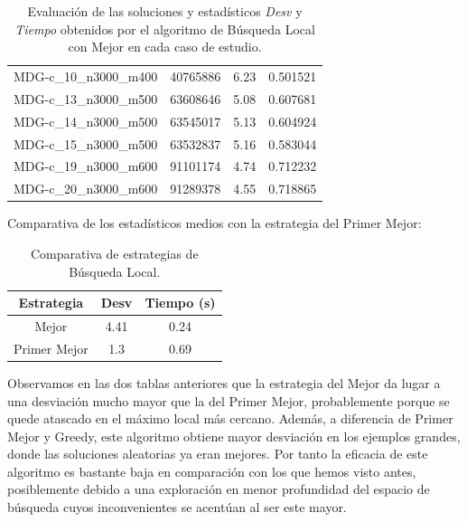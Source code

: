 \documentclass{article}
\begin{document}
\begin{table}[H]
\begin{tabular}{|cccc|}
		MDG-c\_10\_n3000\_m400 & 40765886 & 6.23 & 0.501521\\
		MDG-c\_13\_n3000\_m500 & 63608646 & 5.08 & 0.607681\\
		MDG-c\_14\_n3000\_m500 & 63545017 & 5.13 & 0.604924\\
		MDG-c\_15\_n3000\_m500 & 63532837 & 5.16 & 0.583044\\
		MDG-c\_19\_n3000\_m600 & 91101174 & 4.74 & 0.712232\\
		MDG-c\_20\_n3000\_m600 & 91289378 & 4.55 & 0.718865\\
		\hline
	\end{tabular}
	\caption{Evaluación de las soluciones y estadísticos \emph{Desv} y \emph{Tiempo} obtenidos por el algoritmo de Búsqueda Local
		con Mejor en cada caso de estudio.}
	\label{tab:bs-mejor}
\end{table}


Comparativa de los estadísticos medios con la estrategia del Primer Mejor:

\begin{table}[H]
	\centering
	\begin{tabular}{|ccc|}
		\hline
		Estrategia & Desv & Tiempo (s)\\ \hline
		Mejor & 4.41 & 0.24 \\
		Primer Mejor & 1.3 & 0.69 \\
		\hline
	\end{tabular}
	\caption{Comparativa de estrategias de Búsqueda Local.}
	\label{tab:comparativa-bs}
\end{table}

Observamos en las dos tablas anteriores que la estrategia del Mejor da lugar a una desviación mucho mayor que la del Primer Mejor,
probablemente porque se quede atascado en el máximo local más cercano. Además, a diferencia de Primer Mejor y Greedy, este algoritmo
obtiene mayor desviación en los ejemplos grandes, donde las soluciones aleatorias ya eran mejores. Por tanto la eficacia de este
algoritmo es bastante baja en comparación con los que hemos visto antes, posiblemente debido a una exploración en menor profundidad
del espacio de búsqueda cuyos inconvenientes se acentúan al ser este mayor.
\end{document}
